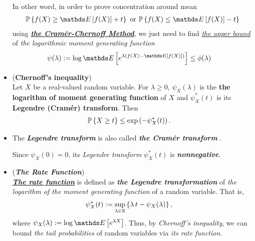 \documentclass[11pt]{article}
\begin{document}
\begin{itemize}
\begin{remark}
In other word, in order to prove concentration around mean 
\begin{align*}
\bP\set{f(X) \ge  \E{}{f(X)} + t} \text{ or } \bP\set{f(X) \le  \E{}{f(X)} - t}
\end{align*}
using \underline{\textbf{\emph{the Cram\'er-Chernoff Method}}}, we just need to find \underline{\emph{the upper bound}} of \emph{the logarithmic moment generating function}
\begin{align*}
\psi(\lambda) := \log \E{}{e^{\lambda (f(X) - \E{}{f(X)})}} &\le \phi(\lambda)
\end{align*}
\end{remark}

\item \begin{proposition} (\textbf{Chernoff's inequality}) \citep{boucheron2013concentration}\\
Let $X$ be a real-valued random variable. For $\lambda \ge 0$,  $\psi_{X}(\lambda)$ is the \textbf{the logarithm of moment generating function} of $X$ and $\psi^{*}_{X}(t)$ is its \textbf{Legendre (Cram{\'e}r) transform}. Then 
\begin{align}
{\mathbb P}\left\{X \ge t\right\} &\le \exp\left(-\psi^{*}_{X}(t)\right). \label{ineqn: chernoff_inequality}
\end{align}
\end{proposition}

\item \begin{remark}
The \textbf{\emph{Legendre transform}} is also called \emph{\textbf{the Cram{\'e}r transform}} \citep{boucheron2013concentration}.

Since $\psi_{X}(0) = 0$, its \emph{Legendre transform} $\psi^{*}_{X}(t)$ is \emph{\textbf{nonnegative}}.
\end{remark}

\item \begin{definition} (\textbf{\emph{The Rate Function}})\\
\underline{\emph{\textbf{The rate function}}} is defined as \emph{\textbf{the Legendre transformation}} of \emph{the logarithm of the moment generating function} of a random variable. That is, 
\begin{align}
\psi^{*}_{X}(t) &:= \sup_{\lambda \in {\mathbb R}}\left\{\lambda\,t - \psi_{X}(\lambda)\right\}, \label{eqn: rate_function}
\end{align} where $\psi_{X}(\lambda) := \log   \E{}{e^{\lambda X}}$. Thus, by \emph{Chernoff's inequality}, we can bound \emph{the tail probabilities} of random variables via \emph{its rate function}.
\end{definition}


\end{itemize}
\end{document}
